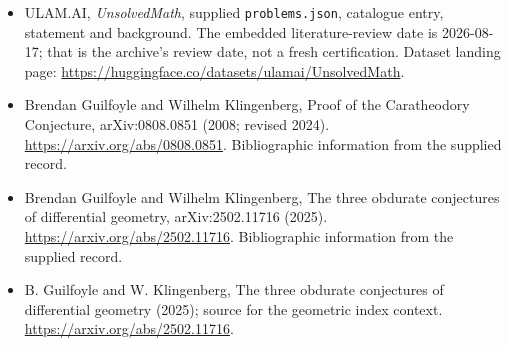 \documentclass[11pt,a4paper]{article}
\begin{document}
{\small

\begin{itemize}

\item[\hypertarget{source:statement:1}{S1}] ULAM.AI, \emph{UnsolvedMath}, supplied \texttt{problems.json}, catalogue entry, statement and background. The embedded literature-review date is 2026-08-17; that is the archive’s review date, not a fresh certification. Dataset landing page: \url{https://huggingface.co/datasets/ulamai/UnsolvedMath}.

\item[\hypertarget{source:statement:2}{S2}] Brendan Guilfoyle and Wilhelm Klingenberg, Proof of the Caratheodory Conjecture, arXiv:0808.0851 (2008; revised 2024). \url{https://arxiv.org/abs/0808.0851}. Bibliographic information from the supplied record.

\item[\hypertarget{source:statement:3}{S3}] Brendan Guilfoyle and Wilhelm Klingenberg, The three obdurate conjectures of differential geometry, arXiv:2502.11716 (2025). \url{https://arxiv.org/abs/2502.11716}. Bibliographic information from the supplied record.

\item[R1] B. Guilfoyle and W. Klingenberg, The three obdurate conjectures of differential geometry (2025); source for the geometric index context.
\url{https://arxiv.org/abs/2502.11716}.
\end{itemize}

}

\label{end:statement}
\end{document}
